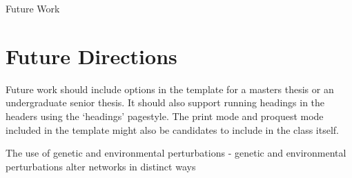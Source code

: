 Future Work

\section{Future Directions}

Future work should include options in the template for a masters thesis or an undergraduate senior thesis. It should also support running headings in the headers using the `headings' pagestyle.  The print mode and proquest mode included in the template might also be candidates to include in the class itself. 

\begin{outline}
\1 The use of genetic and environmental perturbations - genetic and environmental perturbations alter networks in distinct ways
\1 

\end{outline}